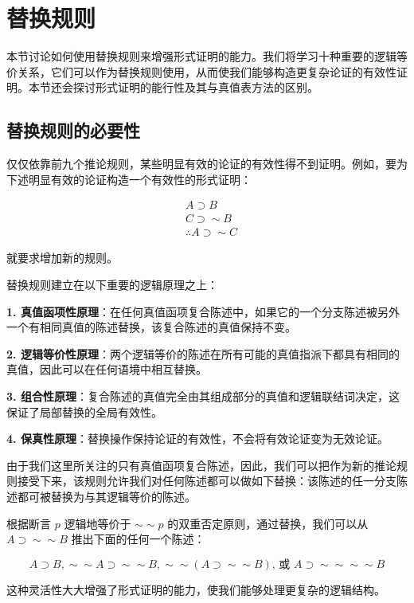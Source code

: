 \section{替换规则}

\begin{logicbox}[title=引言]
本节讨论如何使用替换规则来增强形式证明的能力。我们将学习十种重要的逻辑等价关系，它们可以作为替换规则使用，从而使我们能够构造更复杂论证的有效性证明。本节还会探讨形式证明的能行性及其与真值表方法的区别。
\end{logicbox}

\subsection{替换规则的必要性}

仅仅依靠前九个推论规则，某些明显有效的论证的有效性得不到证明。例如，要为下述明显有效的论证构造一个有效性的形式证明：

$$
\begin{aligned}
& A \supset B \\
& C \supset \sim B \\
& \therefore A \supset \sim C
\end{aligned}
$$

就要求增加新的规则。

\begin{theorembox}[title=替换规则的理论基础]
替换规则建立在以下重要的逻辑原理之上：

\textbf{1. 真值函项性原理}：在任何真值函项复合陈述中，如果它的一个分支陈述被另外一个有相同真值的陈述替换，该复合陈述的真值保持不变。

\textbf{2. 逻辑等价性原理}：两个逻辑等价的陈述在所有可能的真值指派下都具有相同的真值，因此可以在任何语境中相互替换。

\textbf{3. 组合性原理}：复合陈述的真值完全由其组成部分的真值和逻辑联结词决定，这保证了局部替换的全局有效性。

\textbf{4. 保真性原理}：替换操作保持论证的有效性，不会将有效论证变为无效论证。
\end{theorembox}

由于我们这里所关注的只有真值函项复合陈述，因此，我们可以把作为新的推论规则接受下来，该规则允许我们对任何陈述都可以做如下替换：该陈述的任一分支陈述都可被替换为与其逻辑等价的陈述。

\begin{examplebox}[title=替换规则的应用示例]
根据断言 $p$ 逻辑地等价于 $\sim \sim p$ 的双重否定原则，通过替换，我们可以从 $A \supset \sim \sim B$ 推出下面的任何一个陈述：

$$A \supset B, \sim \sim A \supset \sim \sim B, \sim \sim(A \supset \sim \sim B) \text {, 或 } A \supset \sim \sim \sim \sim B$$

这种灵活性大大增强了形式证明的能力，使我们能够处理更复杂的逻辑结构。
\end{examplebox}

